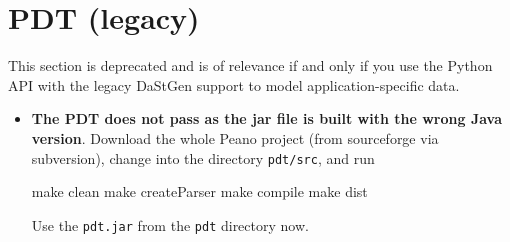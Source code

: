 \section{PDT (legacy)}

This section is deprecated and is of relevance if and only if you use the Python API with 
the legacy DaStGen support to model application-specific data.


\begin{itemize}
  \item \textbf{ The PDT does not pass as the jar file is built with the wrong
  Java version}. Download the whole Peano project (from sourceforge via subversion),
  change into the directory \texttt{pdt/src}, and run
  \begin{code}
  make clean
  make createParser
  make compile
  make dist
  \end{code}
  Use the \texttt{pdt.jar} from the \texttt{pdt} directory now. 
\end{itemize}






